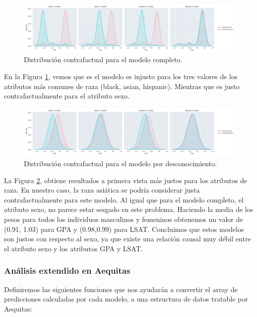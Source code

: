 \documentclass[oneside,openright,titlepage,numbers=noenddot,openany,headinclude,footinclude=true,
cleardoublepage=empty,abstractoff,BCOR=5mm,paper=a4,fontsize=12pt,main=spanish]{scrreprt}
\begin{document}
\begin{figure}[h]
	\centering
	\includegraphics[width=16.8cm]{grafofull.png}
	\caption{Distribución contrafactual para el modelo completo.}
    \label{fig:grafofull}
\end{figure}

En la Figura \ref{fig:grafofull}, vemos que es el modelo es injusto para los tres valores de los atributos más comunes de raza (black, asian, hispanic). Mientras que es justo contrafactualmente para el atributo sexo.\\

\begin{figure}[h]
	\centering
	\includegraphics[width=16.8cm]{grafoware.png}
	\caption{Distribución contrafactual para el modelo por desconocimiento.}
    \label{fig:grafoware}
\end{figure}

La Figura \ref{fig:grafoware}, obtiene resultados a primera vista más justos para los atributos de raza. En nuestro caso, la raza asiática se podría considerar justa contrafactualmente para este modelo. Al igual que para el modelo completo, el atributo sexo, no parece estar sesgado en este problema. Haciendo la media de los pesos para todos los individuos masculinos y femeninos obtenemos un valor de (0.91, 1.03) para GPA y (0.98,0.99) para LSAT. Concluimos que estos modelos son justos con respecto al sexo, ya que existe una relación causal muy débil entre el atributo sexo y los atributos GPA y LSAT.

\subsubsection{Análisis extendido en Aequitas}

Definiremos las siguientes funciones que nos ayudarán a convertir el array de predicciones calculadas por cada modelo, a una estructura de datos tratable por Aequitas:
\end{document}
